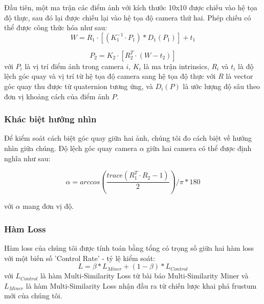 Đầu tiên, một ma trận các điểm ảnh với kích thước 10x10 được chiếu vào hệ tọa độ thực, sau đó lại được chiếu lại vào hệ tọa độ camera thứ hai. Phép chiếu có thể được công thức hóa như sau:
$$
W = R_1\cdot \left[(K_1^{-1} \cdot P_1)*D_1(P_1)\right] + t_1
$$

$$
P_2 = K_2 \cdot\left[R_2^{T} \cdot (W - t_2)\right]
$$
với $P_i$ là vị trí điểm ảnh trong camera $i$, $K_i$ là ma trận intrinsics, $R_i$ và $t_i$ là độ lệch góc quay và vị trí từ hệ tọa độ camera sang hệ tọa độ thực với $R$ là vector góc quay thu được từ quaternion tương ứng, và $D_i(P)$ là ước lượng độ sâu theo đơn vị khoảng cách của điểm ảnh $P$.

\subsubsection*{Khác biệt hướng nhìn}

Để kiểm soát cách biệt góc quay giữa hai ảnh, chúng tôi đo cách biệt về hướng nhìn giữa chúng. Độ lệch góc quay camera $\alpha$ giữa hai camera có thể được định nghĩa như sau:

$$
\alpha = arccos\left(\frac{trace(R_1^T \cdot R_2 - 1)}{2} \right) / \pi * 180
$$

với $\alpha$ mang đơn vị độ.

\subsubsection*{Hàm Loss}

Hàm loss của chúng tôi được tính toán bằng tổng có trọng số giữa hai hàm loss với một biến số 'Control Rate' - tỷ lệ kiểm soát:
$$
L = \beta * L_{Miner} + (1-\beta)*L_{Control}
$$
với $L_{Control}$ là hàm Multi-Similarity Loss từ bài báo Multi-Similarity Miner và $L_{Miner}$ là hàm Multi-Similarity Loss nhận đầu ra từ chiến lược khai phá frustum mới của chúng tôi. 
